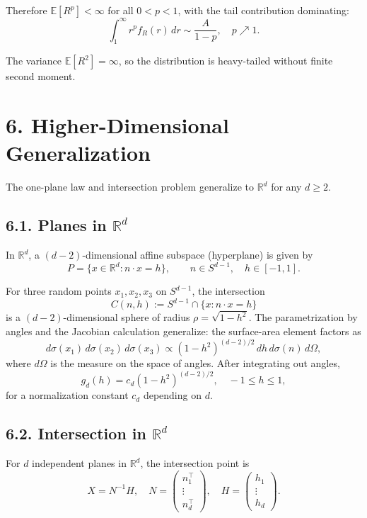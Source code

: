 \documentclass[11pt]{article}
\begin{document}
Therefore $\mathbb{E}[R^p] < \infty$ for all $0 < p < 1$, with the tail contribution dominating:
\[
\int_1^\infty r^p f_R(r)\,dr \sim \frac{A}{1-p}, \quad p \nearrow 1.
\]

The variance $\mathbb{E}[R^2] = \infty$, so the distribution is heavy-tailed without finite second moment.

\section*{6. Higher-Dimensional Generalization}

The one-plane law and intersection problem generalize to $\mathbb{R}^d$ for any $d \ge 2$.

\subsection*{6.1. Planes in $\mathbb{R}^d$}

In $\mathbb{R}^d$, a $(d-2)$-dimensional affine subspace (hyperplane) is given by
\[
P = \{x \in \mathbb{R}^d : n \cdot x = h\}, \qquad n \in S^{d-1}, \quad h \in [-1,1].
\]

For three random points $x_1,x_2,x_3$ on $S^{d-1}$, the intersection
\[
C(n,h) := S^{d-1} \cap \{x : n \cdot x = h\}
\]
is a $(d-2)$-dimensional sphere of radius $\rho = \sqrt{1-h^2}$. The parametrization by angles and
the Jacobian calculation generalize: the surface-area element factors as
\[
d\sigma(x_1)\,d\sigma(x_2)\,d\sigma(x_3)
\propto
(1-h^2)^{(d-2)/2} \, dh \, d\sigma(n) \, d\Omega,
\]
where $d\Omega$ is the measure on the space of angles. After integrating out angles,
\[
\boxed{
g_d(h) = c_d(1-h^2)^{(d-2)/2}, \quad -1 \le h \le 1,
}
\]
for a normalization constant $c_d$ depending on $d$.

\subsection*{6.2. Intersection in $\mathbb{R}^d$}

For $d$ independent planes in $\mathbb{R}^d$, the intersection point is
\[
X = N^{-1}H, \quad N = \begin{pmatrix} n_1^\top \\ \vdots \\ n_d^\top \end{pmatrix}, \quad H = \begin{pmatrix} h_1 \\ \vdots \\ h_d \end{pmatrix}.
\]
\end{document}

